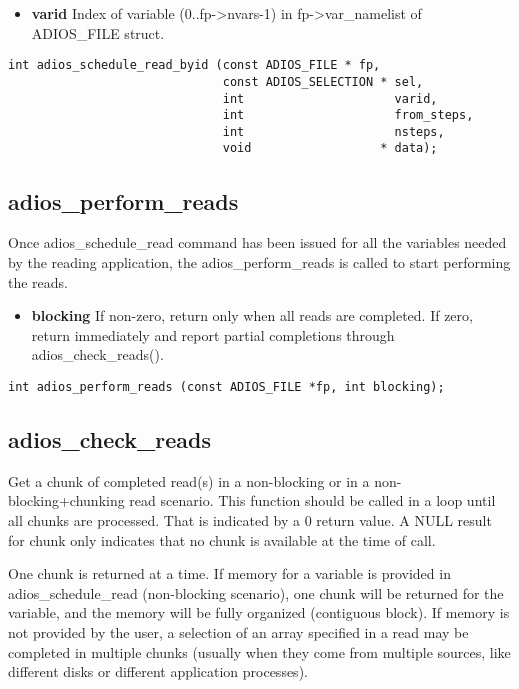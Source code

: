 \begin{itemize}
\item{\bf varid} Index of variable (0..fp->nvars-1) in fp->var\_namelist of ADIOS\_FILE struct. 
\end{itemize}

\begin{lstlisting}[alsolanguage=C]
int adios_schedule_read_byid (const ADIOS_FILE * fp, 
                              const ADIOS_SELECTION * sel,
                              int                     varid,
                              int                     from_steps,
                              int                     nsteps,
                              void                  * data);
\end{lstlisting}



\subsection{adios\_perform\_reads}
Once adios\_schedule\_read command has been issued for all the variables needed by the reading application, the adios\_perform\_reads 
is called to start performing the reads. 
\begin{itemize}
\item{\bf blocking} If non-zero, return only when all reads are completed.
If zero, return immediately and report partial completions
through adios\_check\_reads(). 
\end{itemize}

\begin{lstlisting}[alsolanguage=C]
int adios_perform_reads (const ADIOS_FILE *fp, int blocking);
\end{lstlisting}



\subsection{adios\_check\_reads}
Get a chunk of completed read(s) in a non-blocking or in a non-blocking+chunking read scenario.
This function should be called in a loop until all chunks are processed. 
That is indicated by a 0 return value. A NULL result for chunk only
indicates that no chunk is available at the time of call. 

One chunk is returned at a time. If memory for a variable is provided in adios\_schedule\_read 
(non-blocking scenario), one chunk will be returned for the variable, and the memory will be 
fully organized (contiguous block). If memory is not provided by the user,  a selection of an array 
specified in a read may be completed in multiple chunks (usually when they come from 
multiple sources, like different disks or different application processes). 

